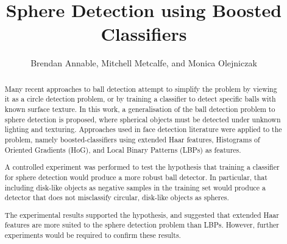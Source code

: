 \documentclass{llncs}
\begin{document}
	\title{Sphere Detection using Boosted Classifiers}
	\author{Brendan Annable, Mitchell Metcalfe, and Monica Olejniczak}


	\maketitle
	\thispagestyle{plain}

	\begin{abstract}
		Many recent approaches to ball detection attempt to simplify the problem by viewing it as a circle detection problem, or by training a classifier to detect specific balls with known surface texture.
		In this work,
		a generalisation of the ball detection problem to sphere detection
		is proposed,
		where spherical objects must be detected under unknown lighting and texturing. Approaches used in face detection literature were applied to the problem, namely boosted-classifiers using extended Haar features, Histograms of Oriented Gradients (HoG), and Local Binary Patterns (LBPs) as features.

		A controlled experiment was performed to test the hypothesis that training a classifier for sphere detection would produce a more robust ball detector. In particular, that including disk-like objects as negative samples in the training set would produce a detector that does not misclassify circular, disk-like objects as spheres.

		The experimental results supported the hypothesis, and suggested that extended Haar features are more suited to the sphere detection problem than LBPs. However, further experiments would be required to confirm these results.





	\end{abstract}
\end{document}
